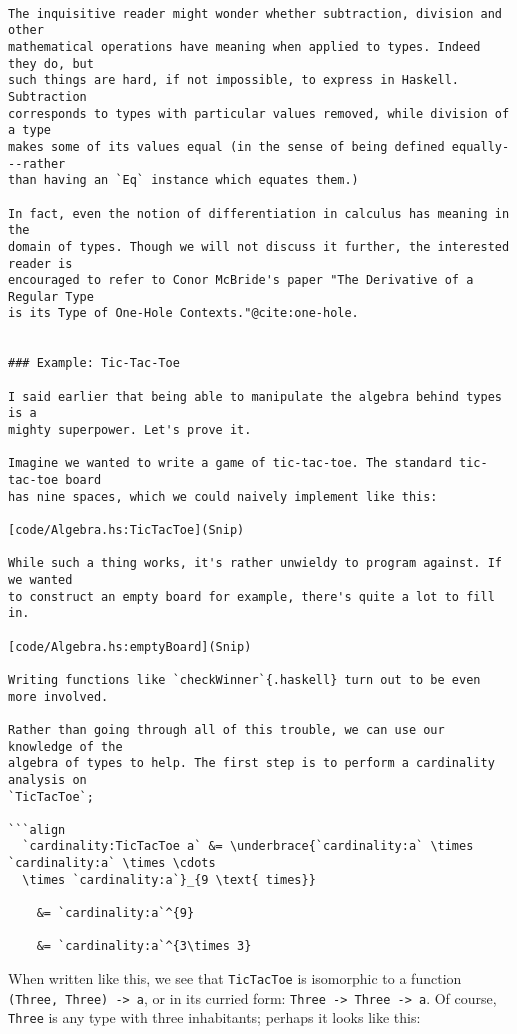 \documentclass[
  11pt,
]{book}
\theoremstyle{nonumberplain}
\begin{document}
\begin{verbatim}

The inquisitive reader might wonder whether subtraction, division and other
mathematical operations have meaning when applied to types. Indeed they do, but
such things are hard, if not impossible, to express in Haskell. Subtraction
corresponds to types with particular values removed, while division of a type
makes some of its values equal (in the sense of being defined equally---rather
than having an `Eq` instance which equates them.)

In fact, even the notion of differentiation in calculus has meaning in the
domain of types. Though we will not discuss it further, the interested reader is
encouraged to refer to Conor McBride's paper "The Derivative of a Regular Type
is its Type of One-Hole Contexts."@cite:one-hole.


### Example: Tic-Tac-Toe

I said earlier that being able to manipulate the algebra behind types is a
mighty superpower. Let's prove it.

Imagine we wanted to write a game of tic-tac-toe. The standard tic-tac-toe board
has nine spaces, which we could naively implement like this:

[code/Algebra.hs:TicTacToe](Snip)

While such a thing works, it's rather unwieldy to program against. If we wanted
to construct an empty board for example, there's quite a lot to fill in.

[code/Algebra.hs:emptyBoard](Snip)

Writing functions like `checkWinner`{.haskell} turn out to be even more involved.

Rather than going through all of this trouble, we can use our knowledge of the
algebra of types to help. The first step is to perform a cardinality analysis on
`TicTacToe`;

```align
  `cardinality:TicTacToe a` &= \underbrace{`cardinality:a` \times `cardinality:a` \times \cdots
  \times `cardinality:a`}_{9 \text{ times}}

    &= `cardinality:a`^{9}

    &= `cardinality:a`^{3\times 3}
\end{verbatim}

When written like this, we see that \texttt{TicTacToe} is isomorphic to
a function \texttt{(Three,\ Three)\ -\textgreater{}\ a}, or in its
curried form:
\texttt{Three\ -\textgreater{}\ Three\ -\textgreater{}\ a}. Of course,
\texttt{Three} is any type with three inhabitants; perhaps it looks like
this:
\end{document}
